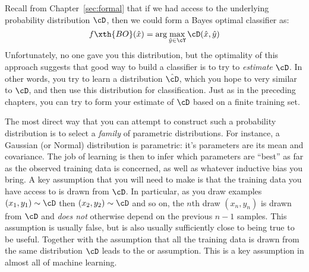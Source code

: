 Recall from Chapter~\ref{sec:formal} that if we had access to the underlying probability distribution $\cD$, then we could form a Bayes optimal classifier as:
%
\begin{equation} \label{eq:prob:bayesopt2}
  f\xth{BO}(\hat x) = \arg\max_{\hat y \in \cY} \cD(\hat x, \hat y)
\end{equation}
%
Unfortunately, no one gave you this distribution, but the optimality of this approach
suggests that good way to build a classifier is to try to
\emph{estimate} $\cD$.  In other words, you try to learn a
distribution $\hat \cD$, which you hope to very similar to $\cD$, and
then use this distribution for classification.  Just as in the
preceding chapters, you can try to form your estimate of $\cD$ based
on a finite training set.

The most direct way that you can attempt to construct such a
probability distribution is to select a \emph{family} of parametric
distributions.  For instance, a Gaussian (or Normal) distribution is
parametric: it's parameters are its mean and covariance.  The job of
learning is then to infer which parameters are ``best'' as far as the
observed training data is concerned, as well as whatever inductive
bias you bring.  A key assumption that you will need to make is that
the training data you have access to is drawn 
from $\cD$.  In particular, as you draw examples $(x_1,y_1) \sim \cD$
then $(x_2,y_2) \sim \cD$ and so on, the $n$th draw $(x_n,y_n)$ is
drawn from $\cD$ and \emph{does not} otherwise depend on the previous
$n-1$ samples.  This assumption is usually false, but is also usually
sufficiently close to being true to be useful.  Together with the
assumption that all the training data is drawn from the same
distribution $\cD$ leads to the  or
 assumption.  This
is a key assumption in almost all of machine learning.

